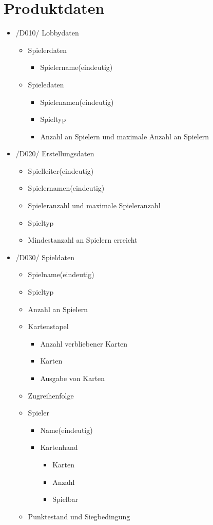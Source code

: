 \documentclass{article}
\begin{document}
\section{Produktdaten}

\begin{itemize}
	\item /D010/ \gls{Lobby}daten
	 \begin{itemize}
	 	\item Spielerdaten
	 	\begin{itemize}
	 		\item Spielername(eindeutig)
	 	\end{itemize}
	 	\item Spieledaten
	 	\begin{itemize}
	 		\item Spielenamen(eindeutig)
	 		\item Spieltyp
	 		\item Anzahl an Spielern und maximale Anzahl an Spielern
	 	\end{itemize}
	 \end{itemize}
	 \item /D020/ Erstellungsdaten
	 \begin{itemize}
	 	\item \gls{Spielleiter}(eindeutig)
	 	\item Spielernamen(eindeutig)
	 	\item Spieleranzahl und maximale Spieleranzahl
	 	\item Spieltyp
	 	\item Mindestanzahl an Spielern erreicht
	 \end{itemize}
	 \item /D030/ Spieldaten
	 \begin{itemize}
	 	\item Spielname(eindeutig)
	 	\item Spieltyp
	 	\item Anzahl an Spielern
	 	\item Kartenstapel
	 	\begin{itemize}
	 		\item Anzahl verbliebener Karten
	 		\item Karten
	 		\item Ausgabe von Karten
	 	\end{itemize}
	 	\item Zugreihenfolge
	 	\item Spieler
	 	\begin{itemize}
	 		\item Name(eindeutig)
	 		\item Kartenhand
	 		\begin{itemize}
	 			\item Karten
	 			\item Anzahl
	 			\item Spielbar
	 		\end{itemize}	 
	 	\end{itemize}
	 	\item Punktestand und Siegbedingung
	 \end{itemize}
\end{itemize}
\end{document}
